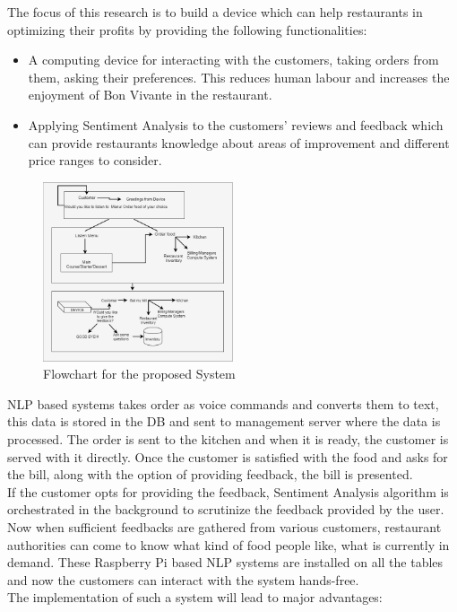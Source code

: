 \documentclass[conference]{IEEEtran}
\begin{document}
The focus of this research is to build a device which can help restaurants in optimizing their profits by providing the following functionalities:
\begin{itemize}
	\item A computing device for interacting with the customers, taking orders from them, asking their preferences. This reduces human labour and increases the enjoyment of Bon Vivante in the restaurant.
	
	\item Applying Sentiment Analysis to the customers' reviews and feedback which can provide restaurants knowledge about areas of improvement and different price ranges to consider.
\end{itemize}
\begin{figure}[!ht]
	\centering
	\includegraphics[width=0.5\textwidth]{overview.png}
	\caption{ Flowchart for the proposed System}
\end{figure}
NLP based systems takes order as voice commands and converts them to text, this data is stored in the DB and sent to management server where the data is processed. The order is sent to the kitchen and when it is ready, the customer is served with it directly. Once the customer is satisfied with the food and asks for the bill, along with the option of providing feedback, the bill is presented.\\
If the customer opts for providing the feedback, Sentiment Analysis algorithm is orchestrated in the background to scrutinize the feedback provided by the user. Now when sufficient feedbacks are gathered from various customers, restaurant authorities can come to know what kind of food people like, what is currently in demand. These Raspberry Pi based NLP systems are installed on all the tables and now the customers can interact with the system hands-free. \\
The implementation of such a system will lead to major advantages: 
\end{document}
